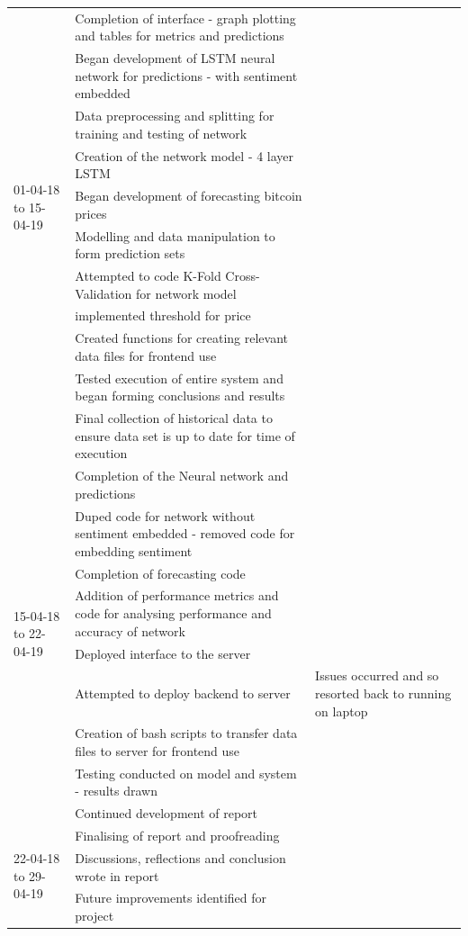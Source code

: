 \documentclass[oneside, 12pt]{article}
\begin{document}
\begin{table}[ht]
{\begin{tabular}{l|l|l}
					\hline
					\multirow{10}{*}{01-04-18 to 15-04-19} & Completion of interface - graph plotting and tables for metrics and predictions \\ & Began development of LSTM neural network for predictions - with sentiment embedded & \\ & Data preprocessing and splitting for training and testing of network & \\ & Creation of the network model - 4 layer LSTM & \\ & Began development of forecasting bitcoin prices & \\ & Modelling and data manipulation to form prediction sets & \\ & Attempted to code K-Fold Cross-Validation for network model & \\ & implemented threshold for price & \\ & Created functions for creating relevant data files for frontend use & \\ & Tested execution of entire system and began forming conclusions and results & \\ & Final collection of historical data to ensure data set is up to date for time of execution & \\
					\hline
					\multirow{8}{*}{15-04-18 to 22-04-19} & Completion of the Neural network and predictions \\ & Duped code for network without sentiment embedded - removed code for embedding sentiment & \\ & Completion of forecasting code & \\ & Addition of performance metrics and code for analysing performance and accuracy of network & \\ & Deployed interface to the server & \\ & Attempted to deploy backend to server & Issues occurred and so resorted back to running on laptop \\ & Creation of bash scripts to transfer data files to server for frontend use & \\ & Testing conducted on model and system - results drawn & \\ & Continued development of report & \\
					\hline
					\multirow{3}{*}{22-04-18 to 29-04-19} & Finalising of report and proofreading \\ & Discussions, reflections and conclusion wrote in report & \\ & Future improvements identified for project & \\
			\end{tabular}}
		\end{table}
	
\end{document}
